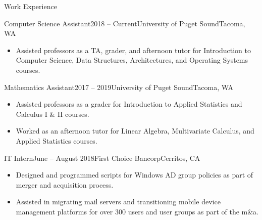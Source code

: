 \documentclass{resume} %
\begin{document}

\begin{rSection}{Work Experience}

\begin{rSubsection}{Computer Science Assistant}{2018 -- Current}{University of Puget Sound}{Tacoma, WA}
\renewcommand\labelitemi{$\cdot$}
\begin{itemize}
\setlength\itemsep{-0.25em}
\item Assisted professors as a TA, grader, and afternoon tutor for Introduction to Computer Science, Data Structures, Architectures, and Operating Systems courses. 
\end{itemize}
\end{rSubsection}


\begin{rSubsection}{Mathematics Assistant}{2017 -- 2019}{University of Puget Sound}{Tacoma, WA}
\renewcommand\labelitemi{$\cdot$}
\begin{itemize}
\setlength\itemsep{-0.25em}
\item Assisted professors as a grader for Introduction to Applied Statistics and Calculus I \& II courses.
\item Worked as an afternoon tutor for Linear Algebra, Multivariate Calculus, and Applied Statistics courses.
\end{itemize}
\end{rSubsection}


\begin{rSubsection}{IT Intern}{June -- August 2018}{First Choice Bancorp}{Cerritos, CA}
\renewcommand\labelitemi{$\cdot$}
\begin{itemize}
\setlength\itemsep{-0.25em}
\item Designed and programmed scripts for Windows AD group policies as part of merger and acquisition process.
\item Assisted in migrating mail servers and transitioning mobile device management platforms for over 300 users and user groups as part of the m\&a.
\end{itemize}
\end{rSubsection}

\end{rSection}
\end{document}
